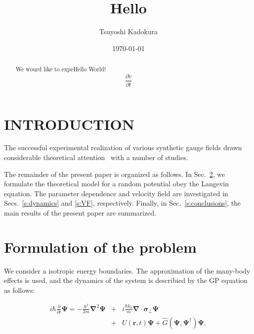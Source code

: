 \documentclass[aps,onecolumn,superscriptaddress,showpacs,pra]{revtex4}
\begin{document}
    \title{Hello}

    \author{Tsuyoshi Kadokura}

    \date{\today}
    \begin{abstract}

        We wourd like to expeHello World! \ 
	    \begin{displaymath}
            \frac{\partial v}{\partial t}
        \end{displaymath}
    \end{abstract}


    \maketitle

    \section{INTRODUCTION}
    \label{s:introduction}

    The successful experimental realization of various synthetic gauge fields
    drawn considerable theoretical attention~\cite{A. Messiah}
    with a number of studies.


    The remainder of the present paper is organized as follows. In
    Sec.~\ref{s:formulation}, we formulate the theoretical model
    for a random potential obey the Langevin equation.
    The parameter dependence and velocity field are investigated in
    Secs.~\ref{s:dynamics} and \ref{s:VF}, respectively.
    Finally, in Sec.~\ref{s:conclusions}, the main results of the present
    paper are summarized.

    \section{Formulation of the problem}
    \label{s:formulation}

    We consider a isotropic energy boundaries.
    The approximation of the many-body effects is used, and the dynamics of the system is
    describied by the GP equation as follows:

    \begin{eqnarray}
        \label{eq:GP}
        i \hbar \frac{\partial}{\partial t}\bm \Psi =
        - \frac{\hbar^2}{2m}\bm{\nabla}^2\bm{\Psi}
        &+&i\frac{\hbar k_0}{m} \bm{\nabla} \cdot \bm{\sigma}_\perp \bm\Psi
        \nonumber\\
        &+&U(\bm r,t)\bm\Psi
        + \hat{G}\left( \bm\Psi,\bm \Psi^\dagger\right)\bm\Psi,
    \end{eqnarray}
\end{document}
